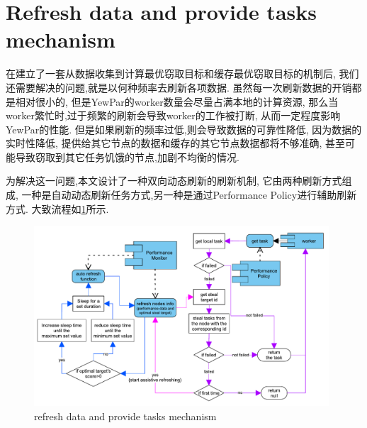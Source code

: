 \documentclass{mproj}
\begin{document}
\section{Refresh data and provide tasks mechanism}

在建立了一套从数据收集到计算最优窃取目标和缓存最优窃取目标的机制后,
我们还需要解决的问题,就是以何种频率去刷新各项数据.
虽然每一次刷新数据的开销都是相对很小的,
但是YewPar的worker数量会尽量占满本地的计算资源,
那么当worker繁忙时,过于频繁的刷新会导致worker的工作被打断,
从而一定程度影响YewPar的性能.
但是如果刷新的频率过低,则会导致数据的可靠性降低,
因为数据的实时性降低,
提供给其它节点的数据和缓存的其它节点数据都将不够准确,
甚至可能导致窃取到其它任务饥饿的节点,加剧不均衡的情况.

为解决这一问题,本文设计了一种双向动态刷新的刷新机制,
它由两种刷新方式组成,
一种是自动动态刷新任务方式,另一种是通过Performance Policy进行辅助刷新方式.
大致流程如\cref{fig:refresh_provide}所示.

\begin{figure}[h]
    \centering %
    \includegraphics[width=0.98\textwidth]{images/refresh.pdf} %
    \caption{refresh data and provide tasks mechanism} %
    \label{fig:refresh_provide} %
\end{figure}
\FloatBarrier
\end{document}
